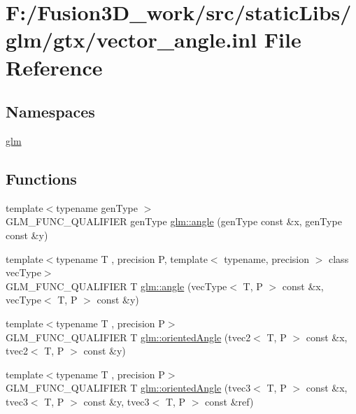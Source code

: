 \hypertarget{vector__angle_8inl}{}\section{F\+:/\+Fusion3\+D\+\_\+work/src/static\+Libs/glm/gtx/vector\+\_\+angle.inl File Reference}
\label{vector__angle_8inl}
\subsection*{Namespaces}
\begin{DoxyCompactItemize}
\item 
 \hyperlink{namespaceglm}{glm}
\end{DoxyCompactItemize}
\subsection*{Functions}
\begin{DoxyCompactItemize}
\item 
{\footnotesize template$<$typename gen\+Type $>$ }\\G\+L\+M\+\_\+\+F\+U\+N\+C\+\_\+\+Q\+U\+A\+L\+I\+F\+I\+E\+R gen\+Type \hyperlink{namespaceglm_a0634619b62db66fe6a4bd04da1feabea}{glm\+::angle} (gen\+Type const \&x, gen\+Type const \&y)
\item 
{\footnotesize template$<$typename T , precision P, template$<$ typename, precision $>$ class vec\+Type$>$ }\\G\+L\+M\+\_\+\+F\+U\+N\+C\+\_\+\+Q\+U\+A\+L\+I\+F\+I\+E\+R T \hyperlink{namespaceglm_a8501bc310fa98bb40bec1b3c285183f1}{glm\+::angle} (vec\+Type$<$ T, P $>$ const \&x, vec\+Type$<$ T, P $>$ const \&y)
\item 
{\footnotesize template$<$typename T , precision P$>$ }\\G\+L\+M\+\_\+\+F\+U\+N\+C\+\_\+\+Q\+U\+A\+L\+I\+F\+I\+E\+R T \hyperlink{group__gtx__vector__angle_ga82a19d474be13c92c7b10caab42a5a72}{glm\+::oriented\+Angle} (tvec2$<$ T, P $>$ const \&x, tvec2$<$ T, P $>$ const \&y)
\item 
{\footnotesize template$<$typename T , precision P$>$ }\\G\+L\+M\+\_\+\+F\+U\+N\+C\+\_\+\+Q\+U\+A\+L\+I\+F\+I\+E\+R T \hyperlink{group__gtx__vector__angle_ga7254dba112eff55f55f9544f41cb9ece}{glm\+::oriented\+Angle} (tvec3$<$ T, P $>$ const \&x, tvec3$<$ T, P $>$ const \&y, tvec3$<$ T, P $>$ const \&ref)
\end{DoxyCompactItemize}


